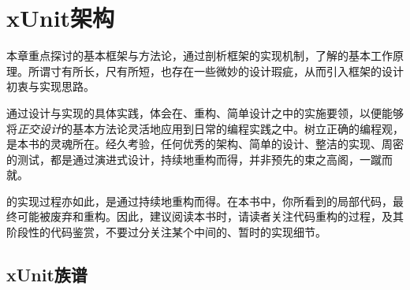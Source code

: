 \begin{savequote}[45mm]
\end{savequote}

\chapter{xUnit架构} 
\label{ch:xunit-architecture}

\begin{content}

本章重点探讨的基本框架与方法论，通过剖析框架的实现机制，了解的基本工作原理。所谓寸有所长，尺有所短，也存在一些微妙的设计瑕疵，从而引入框架的设计初衷与实现思路。

通过设计与实现的具体实践，体会在、重构、简单设计之中的实施要领，以便能够将\emph{正交设计}的基本方法论灵活地应用到日常的编程实践之中。树立正确的编程观，是本书的灵魂所在。经久考验，任何优秀的架构、简单的设计、整洁的实现、周密的测试，都是通过演进式设计，持续地重构而得，并非预先的束之高阁，一蹴而就。

的实现过程亦如此，是通过持续地重构而得。在本书中，你所看到的局部代码，最终可能被废弃和重构。因此，建议阅读本书时，请读者关注代码重构的过程，及其阶段性的代码鉴赏，不要过分关注某个中间的、暂时的实现细节。

\end{content}

\section{xUnit族谱}

